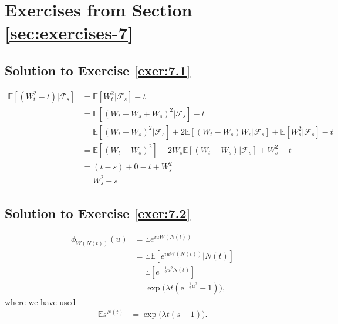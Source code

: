 \documentclass[12pt]{book}
\numberwithin{equation}{chapter}
\theoremstyle{plain}
\numberwithin{theorem}{section}
\theoremstyle{definition}
\numberwithin{exercise}{chapter}
\newcommand{\<}{\langle}
\renewcommand{\>}{\rangle}
\renewcommand{\(}{\left(}
\renewcommand{\)}{\right)}
\renewcommand{\[}{\left[}
\renewcommand{\]}{\right]}
\newcommand\Eb{\mathds{E}}
\newcommand\Fc{\mathscr{F}}
\newcommand\lam{\lambda}
\newcommand\ee{\mathrm{e}}
\begin{document}
\section{Exercises from Section \ref{sec:exercises-7}}

\subsection*{Solution to Exercise \ref{exer:7.1}}
\begin{align}
\Eb[(W_t^2 - t) | \Fc_s ]
     &= \Eb[W_t^2 | \Fc_s ] - t\\
     &= \Eb[(W_t - W_s + W_s)^2 | \Fc_s ] - t\\
     &= \Eb[(W_t - W_s)^2 | \Fc_s] + 2\Eb[(W_t - W_s)W_s | \Fc_s] + \Eb[W_s^2 | \Fc_s] - t\\
     &= \Eb[(W_t - W_s)^2] + 2W_s \Eb[(W_t - W_s)| \Fc_s] + W_s^2 - t\\
     &= (t-s) + 0 - t + W_s^2\\
     &= W_s^2 - s
\end{align}

\subsection*{Solution to Exercise \ref{exer:7.2}}
\begin{align}
\phi_{W(N(t))}(u) &= \Eb{e^{i u W(N(t))}}\\
     &=  \Eb\Eb[{e^{i u W(N(t))} | N(t)}]\\
     &= \Eb[e^{-\frac{1}{2} u^2 N(t) }]\\
			&=	\exp \Big( \lam t ( \ee^{-\frac{1}{2} u^2} -1 ) \Big) ,
\end{align}
where we have used
\begin{align}
\Eb s^{N(t)}
	&=	\exp \Big( \lam t (s-1) \Big) .
\end{align}
\end{document}
